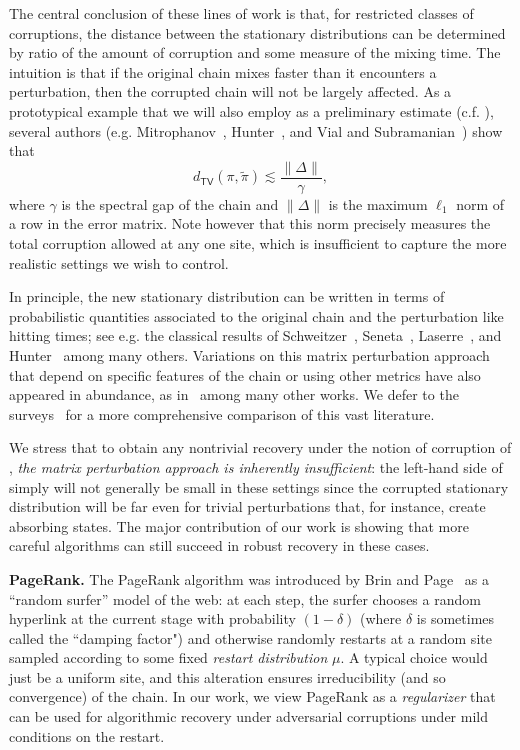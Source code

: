 \documentclass[11pt]{article}
\theoremstyle{remark}
\begin{document}
The central conclusion of these lines of work is that, for restricted classes of corruptions, the distance between the stationary distributions can be determined by ratio of the amount of corruption and some measure of the mixing time. The intuition is that if the original chain mixes faster than it encounters a perturbation, then the corrupted chain will not be largely affected. As a prototypical example that we will also employ as a preliminary estimate (c.f. ), several authors (e.g. Mitrophanov~\cite{mitrophanov2003stability}, Hunter~\cite{HUNTER2005217,hunter2006mixing}, and Vial and Subramanian~\cite{subramanian}) show that 
\begin{equation*}
    d_{\mathsf{TV}}(\pi,\widetilde{\pi})\lesssim \frac{\|\Delta\|}{\gamma},
\end{equation*} 
where $\gamma$ is the spectral gap of the chain and $\|\Delta\|$ is the maximum $\ell_1$ norm of a row in the error matrix. Note however that this norm precisely measures the total corruption allowed at any one site, which is insufficient to capture the more realistic settings we wish to control. 

In principle, the new stationary distribution can be written in terms of probabilistic quantities associated to the original chain and the perturbation like hitting times; see e.g. the classical results of Schweitzer~\cite{schweitzer1968perturbation}, Seneta~\cite{seneta1993sensitivity}, Laserre~\cite{laserre}, and Hunter~\cite{HUNTER2005217} among many others. Variations on this matrix perturbation approach that depend on specific features of the chain or using other metrics have also appeared in abundance, as in~\cite{meyer,thiede, 10.3150/17-BEJ938} among many other works. We defer to the surveys~\cite{CHO2001137,abbas2016critical,rudolf2024perturbations} for a more comprehensive comparison of this vast literature. 

We stress that to obtain any nontrivial recovery under the notion of corruption of , \emph{the matrix perturbation approach is inherently insufficient}: the left-hand side of  simply will not generally be small in these settings since the corrupted stationary distribution will be far even for trivial perturbations that, for instance, create absorbing states. The major contribution of our work is showing that more careful algorithms can still succeed in robust recovery in these cases.

\textbf{PageRank.} The PageRank algorithm was introduced by Brin and Page~\cite{brin1998anatomy} as a ``random surfer'' model of the web: at each step, the surfer chooses a random hyperlink at the current stage with probability $(1-\delta)$ (where $\delta$ is sometimes called the ``damping factor") and otherwise randomly restarts at a random site sampled according to some fixed \emph{restart distribution} $\mu$. A typical choice would just be a uniform site, and this alteration ensures irreducibility (and so convergence) of the chain. In our work, we view PageRank as a \emph{regularizer} that can be used for algorithmic recovery under adversarial corruptions under mild conditions on the restart.
\end{document}
